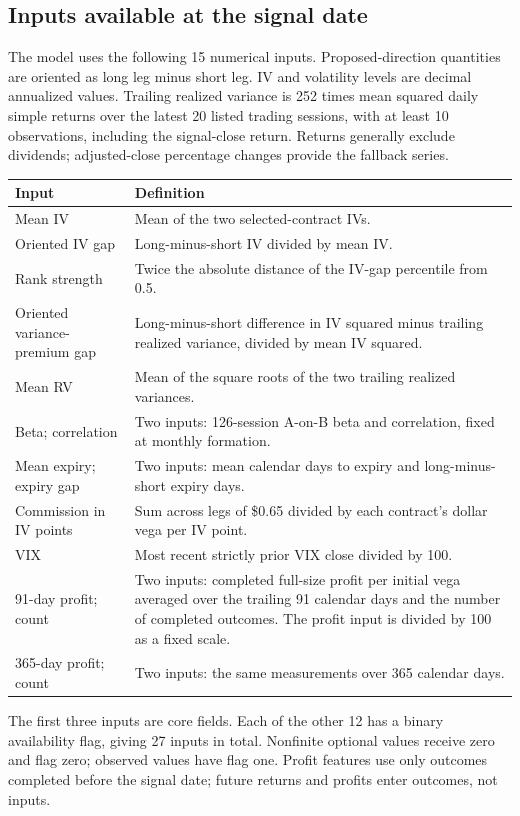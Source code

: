 \documentclass[11pt,letterpaper]{article}
\newcommand{\money}[1]{\$#1}
\begin{document}
\subsection{Inputs available at the signal date}
\label{app:features}
The model uses the following 15 numerical inputs. Proposed-direction quantities
are oriented as long leg minus short leg. IV and volatility levels are decimal
annualized values. Trailing realized variance is 252 times mean squared daily
simple returns over the latest 20 listed trading sessions, with at least 10
observations, including the signal-close return. Returns generally exclude dividends; adjusted-close percentage changes
provide the fallback series.

\begin{center}
\footnotesize
\begin{tabular}{p{}p{}}
\toprule
Input & Definition\\
\midrule
Mean IV & Mean of the two selected-contract IVs.\\
Oriented IV gap & Long-minus-short IV divided by mean IV.\\
Rank strength & Twice the absolute distance of the IV-gap percentile from 0.5.\\
Oriented variance-premium gap & Long-minus-short difference in IV squared minus trailing realized variance, divided by mean IV squared.\\
Mean RV & Mean of the square roots of the two trailing realized variances.\\
Beta; correlation & Two inputs: 126-session A-on-B beta and correlation, fixed at monthly formation.\\
Mean expiry; expiry gap & Two inputs: mean calendar days to expiry and long-minus-short expiry days.\\
Commission in IV points & Sum across legs of \money{0.65} divided by each contract's dollar vega per IV point.\\
VIX & Most recent strictly prior VIX close divided by 100.\\
91-day profit; count & Two inputs: completed full-size profit per initial vega averaged over the trailing 91 calendar days and the number of completed outcomes. The profit input is divided by 100 as a fixed scale.\\
365-day profit; count & Two inputs: the same measurements over 365 calendar days.\\
\bottomrule
\end{tabular}
\end{center}
The first three inputs are core fields. Each of the other 12 has a binary
availability flag, giving 27 inputs in total. Nonfinite optional values receive
zero and flag zero; observed values have flag one. Profit features use only outcomes completed before the signal date;
future returns and profits enter outcomes, not inputs.
\end{document}
